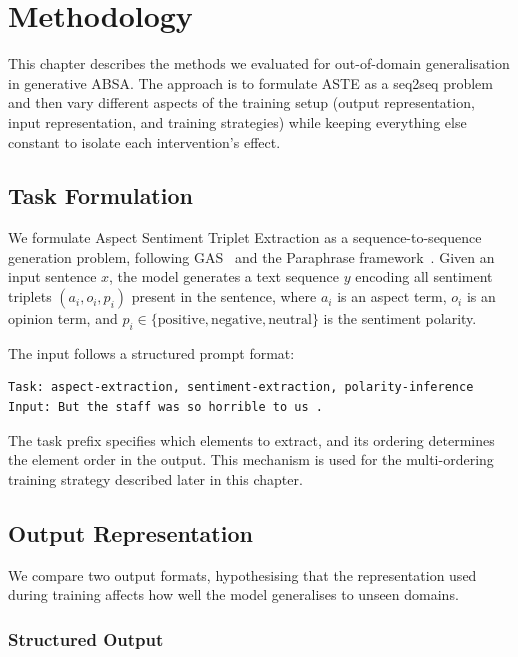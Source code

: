 \documentclass[12pt,a4paper]{report}
\begin{document}
\chapter{Methodology}\label{ch:methodology}

This chapter describes the methods we evaluated for out-of-domain generalisation in generative ABSA. The approach is to formulate ASTE as a seq2seq problem and then vary different aspects of the training setup (output representation, input representation, and training strategies) while keeping everything else constant to isolate each intervention's effect.

\section{Task Formulation}

We formulate Aspect Sentiment Triplet Extraction as a sequence-to-sequence generation problem, following GAS~\cite{zhang2021towards} and the Paraphrase framework~\cite{zhang2021aspect}. Given an input sentence $x$, the model generates a text sequence $y$ encoding all sentiment triplets $(a_i, o_i, p_i)$ present in the sentence, where $a_i$ is an aspect term, $o_i$ is an opinion term, and $p_i \in \{\text{positive}, \text{negative}, \text{neutral}\}$ is the sentiment polarity.

The input follows a structured prompt format:

\begin{lstlisting}
Task: aspect-extraction, sentiment-extraction, polarity-inference
Input: But the staff was so horrible to us .
\end{lstlisting}

The task prefix specifies which elements to extract, and its ordering determines the element order in the output. This mechanism is used for the multi-ordering training strategy described later in this chapter.


\section{Output Representation}\label{sec:output-format}

We compare two output formats, hypothesising that the representation used during training affects how well the model generalises to unseen domains.

\subsection{Structured Output}
\end{document}
